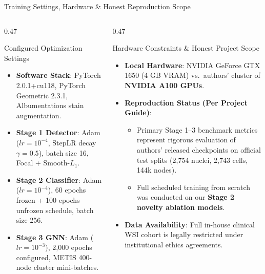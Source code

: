 \documentclass[aspectratio=169, 10pt]{beamer}
\begin{document}
\begin{frame}{Training Settings, Hardware \& Honest Reproduction Scope}
\begin{columns}[onlytextwidth, t]
  \begin{column}{0.47\textwidth}
    \begin{block}{Configured Optimization Settings}
      \parbox[t][4.8cm][t]{\linewidth}{
        \begin{itemize}\footnotesize
          \item \textbf{Software Stack}: PyTorch 2.0.1+cu118, PyTorch Geometric 2.3.1, Albumentations stain augmentation.
          \item \textbf{Stage 1 Detector}: Adam ($lr=10^{-4}$, StepLR decay $\gamma=0.5$), batch size 16, Focal + Smooth-$L_1$.
          \item \textbf{Stage 2 Classifier}: Adam ($lr=10^{-4}$), 60 epochs frozen + 100 epochs unfrozen schedule, batch size 256.
          \item \textbf{Stage 3 GNN}: Adam ($lr=10^{-3}$), 2,000 epochs configured, METIS 400-node cluster mini-batches.
        \end{itemize}
      }
    \end{block}
  \end{column}
  \hfill
  \begin{column}{0.47\textwidth}
    \begin{block}{Hardware Constraints \& Honest Project Scope}
      \parbox[t][4.8cm][t]{\linewidth}{
        \begin{itemize}\footnotesize
          \item \textbf{Local Hardware}: NVIDIA GeForce GTX 1650 (4 GB VRAM) vs.\ authors' cluster of \textbf{NVIDIA A100 GPUs}.
          \item \textbf{Reproduction Status (Per Project Guide)}:
            \begin{itemize}\scriptsize
              \item Primary Stage 1--3 benchmark metrics represent rigorous evaluation of authors' released checkpoints on official test splits (2,754 nuclei, 2,743 cells, 144k nodes).
              \item Full scheduled training from scratch was conducted on our \textbf{Stage 2 novelty ablation models}.
            \end{itemize}
          \item \textbf{Data Availability}: Full in-house clinical WSI cohort is legally restricted under institutional ethics agreements.
        \end{itemize}
      }
    \end{block}
  \end{column}
\end{columns}
\end{frame}
\end{document}
